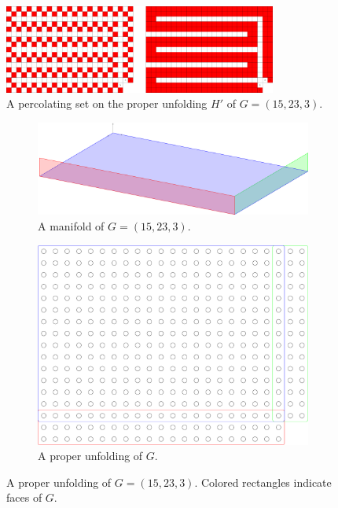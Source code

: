 \begin{figure}[]
\centering
\includegraphics[width=0.8\textwidth]{figures/7/17x25x1_unfolded.pdf}
\caption{A percolating set on the proper unfolding $H'$ of $G= (15,23,3)$.}
\label{fig:17x25x1_unfolded}
\end{figure}

\begin{figure}[]
\centering
\begin{subfigure}{0.45\textwidth}
	\includegraphics[width=\textwidth]{figures/7/17x25x1_manifold_3d.pdf}
	\caption{A manifold of $G= (15,23,3)$.}
	\label{}
\end{subfigure} \hfill%
\begin{subfigure}{0.45\textwidth}
	\includegraphics[width=\textwidth]{figures/7/17x25x1_manifold.pdf}
	\caption{A proper unfolding of $G$.}
	\label{}
\end{subfigure}
\caption{A proper unfolding of $G= (15,23,3)$. Colored rectangles indicate faces of $G$. }
\label{fig:17x25x1_manifold}
\end{figure} 

